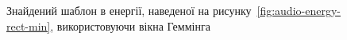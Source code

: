 \begin{figure}[h]

                \caption{Знайдений шаблон в енергії, наведеної на рисунку~\ref{fig:audio-energy-rect-min},
                    використовуючи вікна Геммінга}
                \label{fig:matched-energy-rect-min-hamming}
            \end{figure}





